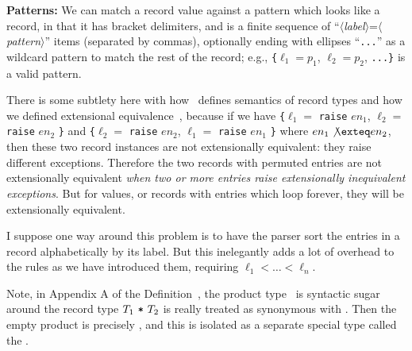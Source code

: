 \begin{node}[Records]
\textbf{Patterns:} We can match a record value against a pattern which
looks like a record, in that it has bracket delimiters, and is a finite
sequence of
``$\langle$\textit{label}$\rangle$=$\langle$\textit{pattern}$\rangle$''
items (separated by commas), optionally ending with ellipses ``\verb|...|''
as a wildcard pattern to match the rest of the record;
e.g., \verb|{|$\ell_{1}=p_{1}$, $\ell_{2}=p_{2}$, \verb|...}| is a valid
pattern. 

\begin{node}\label{sml:core-0002}%
There is some subtlety here with how \SML\ defines semantics of record
types and how we defined extensional equivalence~, because if we have \verb|{|$\ell_{1} = $ \verb|raise| $en_{1}$, $\ell_{2} = $ \verb|raise| $en_{2}$ \verb|}|
and  \verb|{|$\ell_{2} = $ \verb|raise| $en_{2}$, $\ell_{1} = $ \verb|raise| $en_{1}$ \verb|}|
where $en_{1}\not\exteq en_{2}$, then these two record instances are
not extensionally equivalent: they raise different exceptions. Therefore
the two records with permuted entries are not extensionally equivalent
\emph{when two or more entries raise extensionally inequivalent exceptions}.
But for values, or records with entries which loop forever, they will be
extensionally equivalent.

I suppose one way around this problem is to have the parser sort the
entries in a record alphabetically by its label. But this inelegantly
adds a lot of overhead to the rules as we have introduced them,
requiring $\ell_{1}<\dots<\ell_{n}$.
\end{node}
\begin{node}\label{sml:core-0003}%
Note, in Appendix A of the Definition~\cite{milner1997definition},
the product type~ is syntactic sugar around the record
type $T_{1}\mbox{ \texttt{*} }T_{2}$ is really treated as synonymous with
\texttt{}.
Then the empty product is precisely \texttt{\string{\string}}, and this
is isolated as a separate special type called the .
\end{node}
\end{node}
